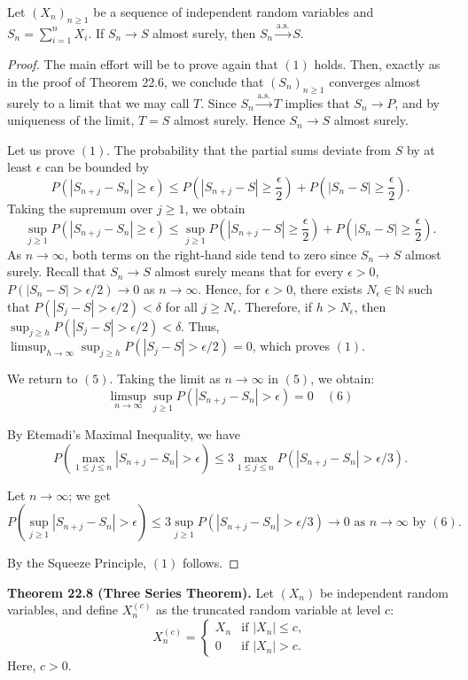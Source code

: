 \begin{theorem}[22.7]
Let $(X_n)_{n\geq1}$ be a sequence of independent random variables and $S_n = \sum_{i=1}^n X_i$. If $S_n \to S$ almost surely, then $S_n \xrightarrow{\text{a.s.}} S$.
\end{theorem}

\begin{proof}
The main effort will be to prove again that $(1)$ holds. Then, exactly as in the proof of Theorem 22.6, we conclude that $(S_n)_{n\geq1}$ converges almost surely to a limit that we may call $T$. Since $S_n \xrightarrow{\text{a.s.}} T$ implies that $S_n \to P$, and by uniqueness of the limit, $T = S$ almost surely. Hence $S_n \to S$ almost surely.

Let us prove $(1)$. The probability that the partial sums deviate from $S$ by at least $\epsilon$ can be bounded by
\[
P(|S_{n+j} - S_n| \geq \epsilon) \leq P(|S_{n+j} - S| \geq \frac{\epsilon}{2}) + P(|S_n - S| \geq \frac{\epsilon}{2}).
\]
Taking the supremum over $j \geq 1$, we obtain
\[
\sup_{j \geq 1} P(|S_{n+j} - S_n| \geq \epsilon) \leq \sup_{j \geq 1} P(|S_{n+j} - S| \geq \frac{\epsilon}{2}) + P(|S_n - S| \geq \frac{\epsilon}{2}).
\]
As $n \to \infty$, both terms on the right-hand side tend to zero since $S_n \to S$ almost surely.
Recall that $S_n \to S$ almost surely means that for every $\epsilon > 0$, $P(|S_n - S| > \epsilon/2) \to 0$ as $n \to \infty$. Hence, for $\epsilon > 0$, there exists $N_\epsilon \in \mathbb{N}$ such that $P(|S_j - S| > \epsilon/2) < \delta$ for all $j \geq N_\epsilon$. Therefore, if $h > N_\epsilon$, then $\sup_{j \geq h} P(|S_j - S| > \epsilon/2) < \delta$. Thus, $\limsup_{h \to \infty} \sup_{j \geq h} P(|S_j - S| > \epsilon/2) = 0$, which proves $(1)$.

We return to $(5)$. Taking the limit as $n \to \infty$ in $(5)$, we obtain:
\[
\limsup_{n \to \infty} \sup_{j \geq 1} P(|S_{n+j} - S_n| > \epsilon) = 0 \quad (6)
\]

By Etemadi's Maximal Inequality, we have
\[
P(\max_{1 \leq j \leq n} |S_{n+j} - S_n| > \epsilon) \leq 3 \max_{1 \leq j \leq n} P(|S_{n+j} - S_n| > \epsilon/3).
\]

Let $n \to \infty$; we get
\[
P(\sup_{j \geq 1} |S_{n+j} - S_n| > \epsilon) \leq 3 \sup_{j \geq 1} P(|S_{n+j} - S_n| > \epsilon/3) \to 0 \text{ as } n \to \infty \text{ by } (6).
\]

By the Squeeze Principle, $(1)$ follows.
\end{proof}

\textbf{Theorem 22.8 (Three Series Theorem).} Let $(X_n)$ be independent random variables, and define $X_n^{(c)}$ as the truncated random variable at level $c$:
\[
X_n^{(c)} = \begin{cases} 
X_n & \text{if } |X_n| \leq c, \\
0 & \text{if } |X_n| > c.
\end{cases}
\]
Here, $c > 0$.

